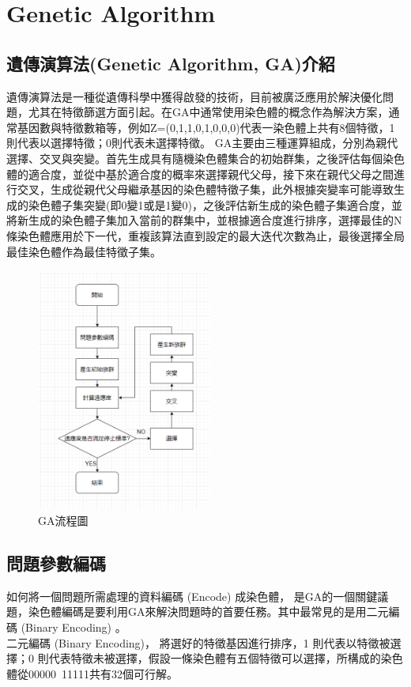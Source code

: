 \chapter{Genetic Algorithm}
\label{chapter:intro}
\section{遺傳演算法(Genetic Algorithm, GA)介紹}
遺傳演算法是一種從遺傳科學中獲得啟發的技術，目前被廣泛應用於解決優化問題，尤其在特徵篩選方面引起。在GA中通常使用染色體的概念作為解決方案，通常基因數與特徵數箱等，例如Z=(0,1,1,0,1,0,0,0)代表一染色體上共有8個特徵，1則代表以選擇特徵；0則代表未選擇特徵。
GA主要由三種運算組成，分別為親代選擇、交叉與突變。首先生成具有隨機染色體集合的初始群集，之後評估每個染色體的適合度，並從中基於適合度的概率來選擇親代父母，接下來在親代父母之間進行交叉，生成從親代父母繼承基因的染色體特徵子集，此外根據突變率可能導致生成的染色體子集突變(即0變1或是1變0)，之後評估新生成的染色體子集適合度，並將新生成的染色體子集加入當前的群集中，並根據適合度進行排序，選擇最佳的N條染色體應用於下一代，重複該算法直到設定的最大迭代次數為止，最後選擇全局最佳染色體作為最佳特徵子集。
\begin{figure}[H]
	\centerline{\includegraphics[height=8cm]{pic/GAprocessrevise .png}}
	\caption{GA流程圖}
	\label{fig:GApro}
\end{figure}

\label{sec:background}
\section{問題參數編碼}
如何將一個問題所需處理的資料編碼 (Encode) 成染色體，
是GA的一個關鍵議題，染色體編碼是要利用GA來解決問題時的首要任務。其中最常見的是用二元編碼 (Binary Encoding) 。\\
二元編碼 (Binary Encoding)，
將選好的特徵基因進行排序，1 則代表以特徵被選擇；0 則代表特徵未被選擇，假設一條染色體有五個特徵可以選擇，所構成的染色體從00000~11111共有32個可行解。



